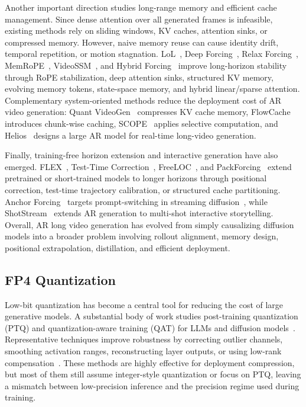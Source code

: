 \documentclass{llmxive}
\begin{document}
Another important direction studies long-range memory and efficient cache management.
Since dense attention over all generated frames is infeasible, existing methods rely on sliding windows, KV caches, attention sinks, or compressed memory.
However, naive memory reuse can cause identity drift, temporal repetition, or motion stagnation.
LoL~\cite{cui2026lol}, Deep Forcing~\cite{yi2025deep}, Relax Forcing~\cite{zhao2026relax}, MemRoPE~\cite{kim2026memrope}, VideoSSM~\cite{yu2025videossm}, and Hybrid Forcing~\cite{li2026hybrid} improve long-horizon stability through RoPE stabilization, deep attention sinks, structured KV memory, evolving memory tokens, state-space memory, and hybrid linear/sparse attention.
Complementary system-oriented methods reduce the deployment cost of AR video generation: Quant VideoGen~\cite{xi2026quant} compresses KV cache memory, FlowCache~\cite{ma2026flowcache} introduces chunk-wise caching, SCOPE~\cite{cui2026scope} applies selective computation, and Helios~\cite{yuan2026helios} designs a large AR model for real-time long-video generation.

Finally, training-free horizon extension and interactive generation have also emerged.
FLEX~\cite{li2026flex}, Test-Time Correction~\cite{xiang2026ttc}, FreeLOC~\cite{tian2026freeloc}, and PackForcing~\cite{mao2026packforcing} extend pretrained or short-trained models to longer horizons through positional correction, test-time trajectory calibration, or structured cache partitioning.
Anchor Forcing~\cite{yang2026anchor} targets prompt-switching in streaming diffusion~\cite{shotadapter}, while ShotStream~\cite{luo2026shotstream} extends AR generation to multi-shot interactive storytelling.
Overall, AR long video generation has evolved from simply causalizing diffusion models into a broader problem involving rollout alignment, memory design, positional extrapolation, distillation, and efficient deployment.

\subsection{FP4 Quantization}
Low-bit quantization has become a central tool for reducing the cost of large generative models. A substantial body of work studies post-training quantization (PTQ) and quantization-aware training (QAT) for LLMs and diffusion models~\cite{zandieh2025turboquant,li2024svdquant,zhao2024vidit}. Representative techniques improve robustness by correcting outlier channels, smoothing activation ranges, reconstructing layer outputs, or using low-rank compensation~\cite{frantar2022gptq,lin2024awq,xiao2023smoothquant,li2024svdquant,huang2024mixture,huang2026mc}. These methods are highly effective for deployment compression, but most of them still assume integer-style quantization or focus on PTQ, leaving a mismatch between low-precision inference and the precision regime used during training.
\end{document}
